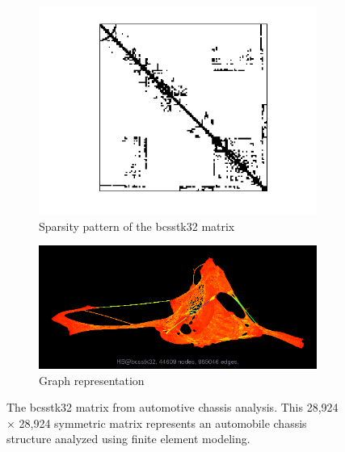 \begin{figure}[!h]
    \centering
    \begin{subfigure}[b]{0.44\textwidth}
        \centering
        \includegraphics[width=\textwidth]{fig/intro/bcsstk32.png}
        \caption{Sparsity pattern of the bcsstk32 matrix}
        \label{fig:bcsstk32-matrix}
    \end{subfigure}
    \hfill
    \begin{subfigure}[b]{0.44\textwidth}
        \centering
        \includegraphics[width=\textwidth]{fig/intro/bcsstk32_graph.png}
        \caption{Graph representation}
        \label{fig:bcsstk32-graph}
    \end{subfigure}
    \caption{The bcsstk32 matrix from automotive chassis analysis. This 28,924 × 28,924 symmetric matrix represents an automobile chassis structure analyzed using finite element modeling.}
    \label{fig:bcsstk32-example}
\end{figure}


